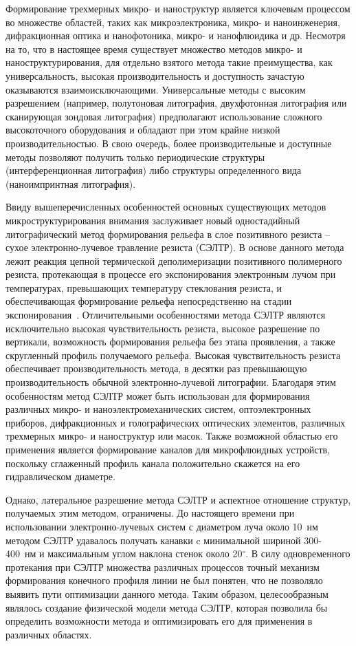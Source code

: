 \actuality
Формирование трехмерных микро- и наноструктур является ключевым процессом во множестве областей, таких как микроэлектроника, микро- и наноинженерия, дифракционная оптика и нанофотоника, микро- и нанофлюидика и др. Несмотря на то, что в настоящее время существует множество методов микро- и наноструктурирования, для отдельно взятого метода такие преимущества, как универсальность, высокая производительность и доступность зачастую оказываются взаимоисключающими. Универсальные методы с высоким разрешением (например, полутоновая литография, двухфотонная литография или сканирующая зондовая литография) предполагают использование сложного высокоточного оборудования и обладают при этом крайне низкой производительностью. В свою очередь, более производительные и доступные методы позволяют получить только периодические структуры (интерференционная литография) либо структуры определенного вида (наноимпринтная литография).

Ввиду вышеперечисленных особенностей основных существующих методов микроструктурирования внимания заслуживает новый одностадийный литографический метод формирования рельефа в слое позитивного резиста -- сухое электронно-лучевое травление резиста (СЭЛТР). В основе данного метода лежит реакция цепной термической деполимеризации позитивного полимерного резиста, протекающая в процессе его экспонирования электронным лучом при температурах, превышающих температуру стеклования резиста, и обеспечивающая формирование рельефа непосредственно на стадии экспонирования~\cite{Bruk_2013, Bruk_2016_mee}. Отличительными особенностями метода СЭЛТР являются исключительно высокая чувствительность резиста, высокое разрешение по вертикали, возможность формирования рельефа без этапа проявления, а также скругленный профиль получаемого рельефа. Высокая чувствительность резиста обеспечивает производительность метода, в десятки раз превышающую производительность обычной электронно-лучевой литографии. Благодаря этим особенностям метод СЭЛТР может быть использован для формирования различных микро- и наноэлектромеханических систем, оптоэлектронных приборов, дифракционных и голографических оптических элементов, различных трехмерных микро- и наноструктур или масок. Также возможной областью его применения является формирование каналов для микрофлюидных устройств, поскольку сглаженный профиль канала положительно скажется на его гидравлическом диаметре.

Однако, латеральное разрешение метода СЭЛТР и аспектное отношение структур, получаемых этим методом, ограничены. До настоящего времени при использовании электронно-лучевых систем с диаметром луча около 10~нм методом СЭЛТР удавалось получать канавки c минимальной шириной 300-400~нм и максимальным углом наклона стенок около 20$^\circ$. В силу одновременного протекания при СЭЛТР множества различных процессов точный механизм формирования конечного профиля линии не был понятен, что не позволяло выявить пути оптимизации данного метода. Таким образом, целесообразным являлось создание физической модели метода СЭЛТР, которая позволила бы определить возможности метода и оптимизировать его для применения в различных областях.


